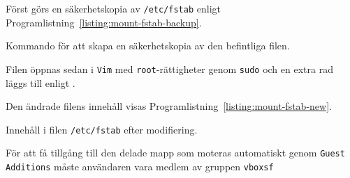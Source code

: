Först görs en säkerhetskopia av \texttt{/etc/fstab} enligt
Programlistning~\ref{listing:mount-fstab-backup}.

\begin{listing}[H]
  \caption{Kommando för att skapa en säkerhetskopia av den befintliga filen.}
  \label{listing:mount-fstab-backup}
\end{listing}

Filen öppnas sedan i \texttt{Vim} med \texttt{root}-rättigheter genom
\texttt{sudo} och en extra rad läggs till enligt \cite{virtualbox:mntshare}.

Den ändrade filens innehåll visas
Programlistning~\ref{listing:mount-fstab-new}.

\begin{listing}[H]
  \caption{Innehåll i filen \texttt{/etc/fstab} efter modifiering.}
  \label{listing:mount-fstab-new}
\end{listing}

För att få tillgång till den delade mapp som moteras automatiskt genom
\texttt{Guest Additions} måste användaren vara medlem av gruppen \texttt{vboxsf}





